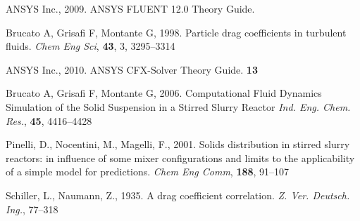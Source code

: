 \begin{thebibliography}{99}

 ANSYS Inc., 2009. ANSYS FLUENT 12.0 Theory Guide.


 Brucato A, Grisafi F, Montante G, 1998. Particle drag coefficients in turbulent fluids. \textit{Chem Eng Sci}, \textbf{43}, 3, 3295--3314

 ANSYS Inc., 2010. ANSYS CFX-Solver Theory Guide. \textbf{13}

 Brucato A, Grisafi F, Montante G, 2006. Computational Fluid Dynamics Simulation of the Solid Suspension in a Stirred Slurry Reactor \textit{Ind. Eng. Chem. Res.}, \textbf{45}, 4416--4428


 Pinelli, D., Nocentini, M., Magelli, F., 2001. Solids distribution in stirred slurry reactors: in influence of some mixer configurations and limits to the applicability of a simple model for predictions.
\textit{Chem Eng Comm}, \textbf{188}, 91--107

 Schiller, L., Naumann, Z., 1935. A drag coefficient correlation. \textit{Z. Ver. Deutsch. Ing.}, 77--318

\end{thebibliography}
